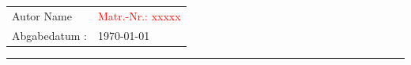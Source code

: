 \begin{center}
{\fontsize{12pt}{12} \selectfont%
\begin{tabular}{ll}
Autor Name & \textcolor{red}{Matr.-Nr.: xxxxx}\\[0.5ex] %
Abgabedatum :& \today   %
\end{tabular}
}
\end{center}
                               

\vspace{1cm}

\vspace{1cm}
\hrule



